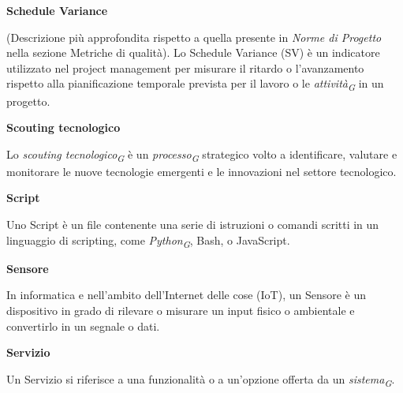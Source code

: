 \documentclass{article}
\begin{document}
\vspace{0.4cm}

\textbf{Schedule Variance}

\vspace{0.1cm}

(Descrizione più approfondita rispetto a quella presente in \textit{Norme di Progetto} nella sezione Metriche di qualità). Lo Schedule Variance (SV) è un indicatore utilizzato nel project management per misurare il ritardo o l'avanzamento rispetto alla pianificazione temporale prevista per il lavoro o le \textit{attività}\textsubscript{\textit{G}} in un progetto.

\vspace{0.4cm}

\textbf{Scouting tecnologico}

\vspace{0.1cm}

Lo \textit{scouting tecnologico}\textsubscript{\textit{G}} è un \textit{processo}\textsubscript{\textit{G}} strategico volto a identificare, valutare e monitorare le nuove tecnologie emergenti e le innovazioni nel settore tecnologico.

\vspace{0.4cm}

\textbf{Script}

\vspace{0.1cm}

Uno Script è un file contenente una serie di istruzioni o comandi scritti in un linguaggio di scripting, come \textit{Python}\textsubscript{\textit{G}}, Bash, o JavaScript.

\vspace{0.4cm}

\textbf{Sensore}

\vspace{0.1cm}

In informatica e nell'ambito dell'Internet delle cose (IoT), un Sensore è un dispositivo in grado di rilevare o misurare un input fisico o ambientale e convertirlo in un segnale o dati.

\vspace{0.4cm}

\textbf{Servizio}

\vspace{0.1cm}

Un Servizio si riferisce a una funzionalità o a un'opzione offerta da un \textit{sistema}\textsubscript{\textit{G}}.

\vspace{0.4cm}
\end{document}
